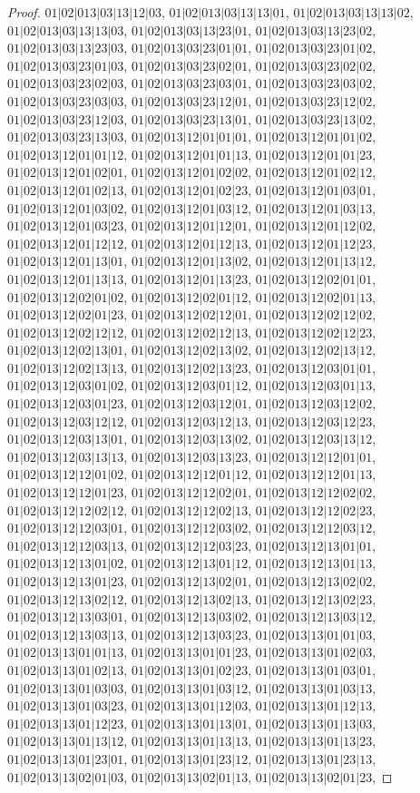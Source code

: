 \documentclass[12pt]{article}
\theoremstyle{plain}
\theoremstyle{definition}
\theoremstyle{remark}
\begin{document}
\begin{proof}
$01|02|013|03|13|12|03$, $01|02|013|03|13|13|01$, $01|02|013|03|13|13|02$, $01|02|013|03|13|13|03$, $01|02|013|03|13|23|01$, $01|02|013|03|13|23|02$, $01|02|013|03|13|23|03$, $01|02|013|03|23|01|01$, $01|02|013|03|23|01|02$, $01|02|013|03|23|01|03$, $01|02|013|03|23|02|01$, $01|02|013|03|23|02|02$, $01|02|013|03|23|02|03$, $01|02|013|03|23|03|01$, $01|02|013|03|23|03|02$, $01|02|013|03|23|03|03$, $01|02|013|03|23|12|01$, $01|02|013|03|23|12|02$, $01|02|013|03|23|12|03$, $01|02|013|03|23|13|01$, $01|02|013|03|23|13|02$, $01|02|013|03|23|13|03$, $01|02|013|12|01|01|01$, $01|02|013|12|01|01|02$, $01|02|013|12|01|01|12$, $01|02|013|12|01|01|13$, $01|02|013|12|01|01|23$, $01|02|013|12|01|02|01$, $01|02|013|12|01|02|02$, $01|02|013|12|01|02|12$, $01|02|013|12|01|02|13$, $01|02|013|12|01|02|23$, $01|02|013|12|01|03|01$, $01|02|013|12|01|03|02$, $01|02|013|12|01|03|12$, $01|02|013|12|01|03|13$, $01|02|013|12|01|03|23$, $01|02|013|12|01|12|01$, $01|02|013|12|01|12|02$, $01|02|013|12|01|12|12$, $01|02|013|12|01|12|13$, $01|02|013|12|01|12|23$, $01|02|013|12|01|13|01$, $01|02|013|12|01|13|02$, $01|02|013|12|01|13|12$, $01|02|013|12|01|13|13$, $01|02|013|12|01|13|23$, $01|02|013|12|02|01|01$, $01|02|013|12|02|01|02$, $01|02|013|12|02|01|12$, $01|02|013|12|02|01|13$, $01|02|013|12|02|01|23$, $01|02|013|12|02|12|01$, $01|02|013|12|02|12|02$, $01|02|013|12|02|12|12$, $01|02|013|12|02|12|13$, $01|02|013|12|02|12|23$, $01|02|013|12|02|13|01$, $01|02|013|12|02|13|02$, $01|02|013|12|02|13|12$, $01|02|013|12|02|13|13$, $01|02|013|12|02|13|23$, $01|02|013|12|03|01|01$, $01|02|013|12|03|01|02$, $01|02|013|12|03|01|12$, $01|02|013|12|03|01|13$, $01|02|013|12|03|01|23$, $01|02|013|12|03|12|01$, $01|02|013|12|03|12|02$, $01|02|013|12|03|12|12$, $01|02|013|12|03|12|13$, $01|02|013|12|03|12|23$, $01|02|013|12|03|13|01$, $01|02|013|12|03|13|02$, $01|02|013|12|03|13|12$, $01|02|013|12|03|13|13$, $01|02|013|12|03|13|23$, $01|02|013|12|12|01|01$, $01|02|013|12|12|01|02$, $01|02|013|12|12|01|12$, $01|02|013|12|12|01|13$, $01|02|013|12|12|01|23$, $01|02|013|12|12|02|01$, $01|02|013|12|12|02|02$, $01|02|013|12|12|02|12$, $01|02|013|12|12|02|13$, $01|02|013|12|12|02|23$, $01|02|013|12|12|03|01$, $01|02|013|12|12|03|02$, $01|02|013|12|12|03|12$, $01|02|013|12|12|03|13$, $01|02|013|12|12|03|23$, $01|02|013|12|13|01|01$, $01|02|013|12|13|01|02$, $01|02|013|12|13|01|12$, $01|02|013|12|13|01|13$, $01|02|013|12|13|01|23$, $01|02|013|12|13|02|01$, $01|02|013|12|13|02|02$, $01|02|013|12|13|02|12$, $01|02|013|12|13|02|13$, $01|02|013|12|13|02|23$, $01|02|013|12|13|03|01$, $01|02|013|12|13|03|02$, $01|02|013|12|13|03|12$, $01|02|013|12|13|03|13$, $01|02|013|12|13|03|23$, $01|02|013|13|01|01|03$, $01|02|013|13|01|01|13$, $01|02|013|13|01|01|23$, $01|02|013|13|01|02|03$, $01|02|013|13|01|02|13$, $01|02|013|13|01|02|23$, $01|02|013|13|01|03|01$, $01|02|013|13|01|03|03$, $01|02|013|13|01|03|12$, $01|02|013|13|01|03|13$, $01|02|013|13|01|03|23$, $01|02|013|13|01|12|03$, $01|02|013|13|01|12|13$, $01|02|013|13|01|12|23$, $01|02|013|13|01|13|01$, $01|02|013|13|01|13|03$, $01|02|013|13|01|13|12$, $01|02|013|13|01|13|13$, $01|02|013|13|01|13|23$, $01|02|013|13|01|23|01$, $01|02|013|13|01|23|12$, $01|02|013|13|01|23|13$, $01|02|013|13|02|01|03$, $01|02|013|13|02|01|13$, $01|02|013|13|02|01|23$, 
\end{proof}
\end{document}
